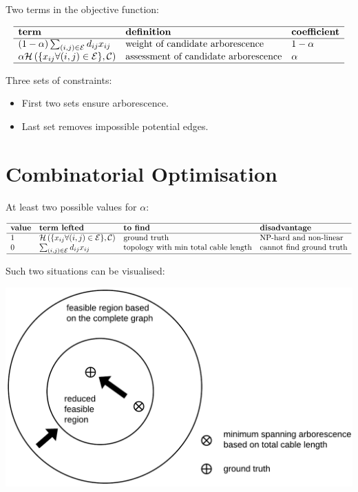 \documentclass[
]{book}
\providecommand{\tightlist}{%
  \setlength{\itemsep}{0pt}\setlength{\parskip}{0pt}}
\begin{document}
Two terms in the objective function:

\[
\begin{array}{lll}
  \hline
  \textbf{term} & \textbf{definition} & \textbf{coefficient} \\
  \hline
  (1 - \alpha) \sum_{(i, j) \in \mathcal{E}} d_{i j} x_{i j}
  & \text{weight of candidate arborescence}
  & 1 - \alpha \\
  \alpha \mathcal{H}
  \left(\{x_{i j} \forall (i, j) \in \mathcal{E} \}, \mathcal{C} \right)
  & \text{assessment of candidate arborescence}
  & \alpha \\
  \hline
\end{array}
\]

Three sets of constraints:

\begin{itemize}
\tightlist
\item
  First two sets ensure arborescence.
\item
  Last set removes impossible potential edges.
\end{itemize}

\hypertarget{combinatorial}{%
\section{Combinatorial Optimisation}\label{combinatorial}}

At least two possible values for \(\alpha\):

\[
\begin{array}{llll}
  \hline
  \textbf{value} & \textbf{term lefted} & \textbf{to find}
  & \textbf{disadvantage} \\
  \hline
  1
  & \mathcal{H}
  \left(\{x_{i j} \forall (i, j) \in \mathcal{E} \}, \mathcal{C} \right)
  & \text{ground truth}
  & \text{NP-hard and non-linear} \\
  0
  & \sum_{(i, j) \in \mathcal{E}} d_{i j} x_{i j}
  & \text{topology with min total cable length}
  & \text{cannot find ground truth} \\
  \hline
\end{array}
\]

Such two situations can be visualised:

\begin{center}\includegraphics[width=0.7\linewidth]{Pictures/figFeasibleRegion} \end{center}
\end{document}
